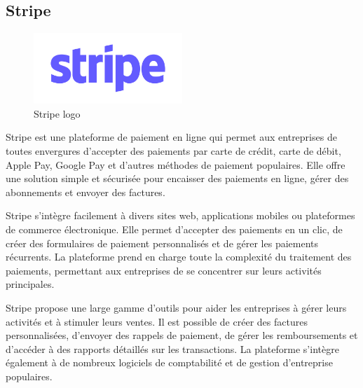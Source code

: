 \documentclass[a4paper,12pt]{report}
\numberwithin{equation}{section}
\begin{document}
\subsection{Stripe}
\begin{figure}[H]
    \centering
    \includegraphics[width=0.5\textwidth]{tech/stripe-logo.png}
    \caption{Stripe logo}
    \label{fig:Stripe logo}
\end{figure}
\par
Stripe est une plateforme de paiement en ligne qui permet aux entreprises de toutes envergures d'accepter des paiements par carte de crédit, carte de débit, Apple Pay, Google Pay et d'autres méthodes de paiement populaires. Elle offre une solution simple et sécurisée pour encaisser des paiements en ligne, gérer des abonnements et envoyer des factures.
\\ \par
Stripe s'intègre facilement à divers sites web, applications mobiles ou plateformes de commerce électronique. Elle permet d'accepter des paiements en un clic, de créer des formulaires de paiement personnalisés et de gérer les paiements récurrents. La plateforme prend en charge toute la complexité du traitement des paiements, permettant aux entreprises de se concentrer sur leurs activités principales.
\\ \par
Stripe propose une large gamme d'outils pour aider les entreprises à gérer leurs activités et à stimuler leurs ventes. Il est possible de créer des factures personnalisées, d'envoyer des rappels de paiement, de gérer les remboursements et d'accéder à des rapports détaillés sur les transactions. La plateforme s'intègre également à de nombreux logiciels de comptabilité et de gestion d'entreprise populaires.
\newpage
\end{document}
